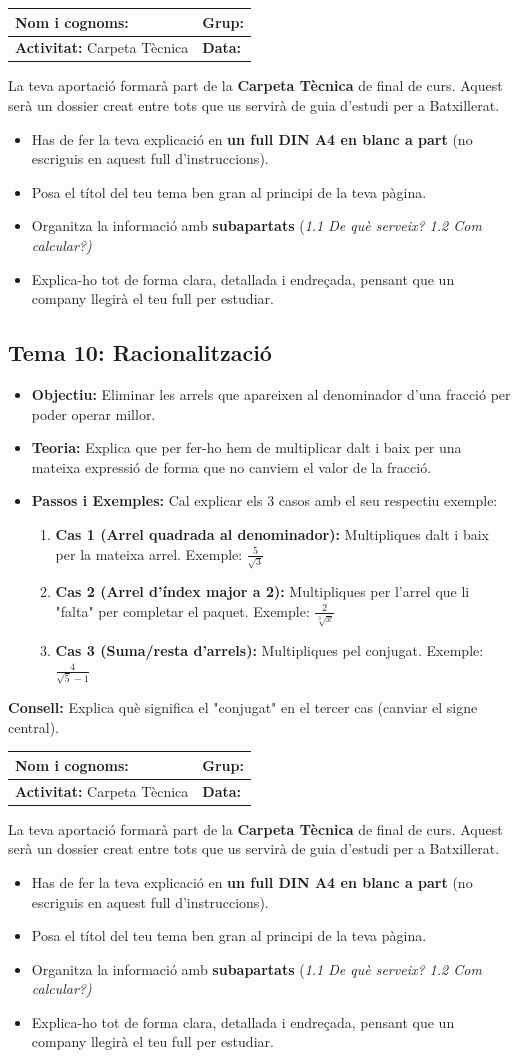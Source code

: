 \documentclass[12pt,a4paper]{article}
\newcommand{\introcomuna}{
    \begin{tcolorbox}[colback=gray!5,colframe=gray!50!black,title=\textbf{La Carpeta Tècnica de Matemàtiques}]
    La teva aportació formarà part de la \textbf{Carpeta Tècnica} de final de curs. Aquest serà un dossier creat entre tots que us servirà de guia d'estudi per a Batxillerat.
    
    \begin{itemize}[label=\textbullet, leftmargin=*]
        \item Has de fer la teva explicació en \textbf{un full DIN A4 en blanc a part} (no escriguis en aquest full d'instruccions).
        \item Posa el títol del teu tema ben gran al principi de la teva pàgina.
        \item Organitza la informació amb \textbf{subapartats} (\textit{1.1 De què serveix? 1.2 Com calcular?)}
        \item Explica-ho tot de forma clara, detallada i endreçada, pensant que un company llegirà el teu full per estudiar.
    \end{itemize}
    \end{tcolorbox}
    \vspace{0.1cm}
}
\newcommand{\capcaleraalumne}[1]{
    \begingroup
    \renewcommand{\arraystretch}{2.2}
    \begin{tabularx}{\textwidth}{|X|p{4cm}|}
    \hline
    \textbf{Nom i cognoms:} & \textbf{Grup:} \\ \hline
    \textbf{Activitat:} Carpeta Tècnica & \textbf{Data:} \\ \hline
    \end{tabularx}
    \endgroup
    \vspace{0.4cm}
}
\begin{document}
\newpage
\capcaleraalumne{10}
\introcomuna
\subsection*{Tema 10: Racionalització}
\begin{itemize}[label=\textbullet]
    \item \textbf{Objectiu:} Eliminar les arrels que apareixen al denominador d'una fracció per poder operar millor.
    \item \textbf{Teoria:} Explica que per fer-ho hem de multiplicar dalt i baix per una mateixa expressió de forma que no canviem el valor de la fracció.
    \item \textbf{Passos i Exemples:} Cal explicar els 3 casos amb el seu respectiu exemple:
    \begin{enumerate}
        \item \textbf{Cas 1 (Arrel quadrada al denominador):} Multipliques dalt i baix per la mateixa arrel. Exemple: $\displaystyle \frac{5}{\sqrt{3}}$
        \item \textbf{Cas 2 (Arrel d'índex major a 2):} Multipliques per l'arrel que li "falta" per completar el paquet. Exemple: $\displaystyle \frac{2}{\sqrt[3]{x}}$
        \item \textbf{Cas 3 (Suma/resta d'arrels):} Multipliques pel conjugat. Exemple: $\displaystyle \frac{4}{\sqrt{5}-1}$
    \end{enumerate}
\end{itemize}
\vfill
\noindent\textbf{Consell:} Explica què significa el "conjugat" en el tercer cas (canviar el signe central).

\newpage
\capcaleraalumne{11}
\introcomuna
\end{document}
